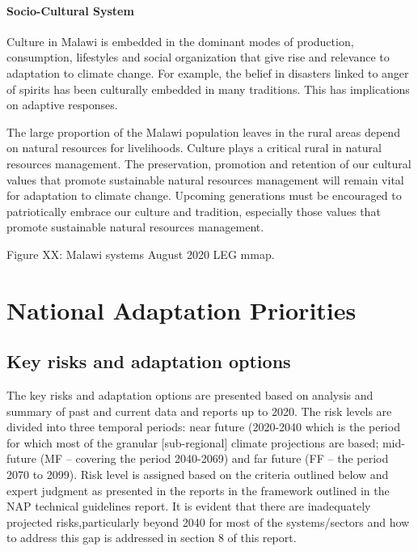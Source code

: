 \documentclass[
]{book}
\begin{document}
\hypertarget{socio-cultural-system}{%
\subsubsection{Socio-Cultural System}\label{socio-cultural-system}}

Culture in Malawi is embedded in the dominant modes of production, consumption, lifestyles and social organization that give rise and relevance to adaptation to
climate change. For example, the belief in disasters linked to anger of spirits has been culturally embedded in many traditions. This has implications on
adaptive responses.

The large proportion of the Malawi population leaves in the rural areas depend on natural resources for livelihoods. Culture plays a critical rural in natural
resources management. The preservation, promotion and retention of our cultural values that promote sustainable natural resources management will remain vital
for adaptation to climate change. Upcoming generations must be encouraged to patriotically embrace our culture and tradition, especially those values that
promote sustainable natural resources management.

Figure XX: Malawi systems August 2020 LEG mmap.

\hypertarget{national-adaptation-priorities}{%
\chapter{National Adaptation Priorities}\label{national-adaptation-priorities}}

\hypertarget{key-risks-and-adaptation-options}{%
\section{Key risks and adaptation options}\label{key-risks-and-adaptation-options}}

The key risks and adaptation options are presented based on analysis and summary of past and current data and reports up to 2020. The risk levels are divided into three temporal periods: near future (2020-2040 which is the period for which most of the granular {[}sub-regional{]} climate projections are based; mid-future (MF -- covering the period 2040-2069) and far future (FF -- the period 2070 to 2099). Risk level is assigned based on the criteria outlined below and expert judgment as presented in the reports in the framework outlined in the NAP technical guidelines report. It is evident that there are inadequately projected risks,particularly beyond 2040 for most of the systems/sectors and how to address this gap is addressed in section 8 of this report.
\end{document}
